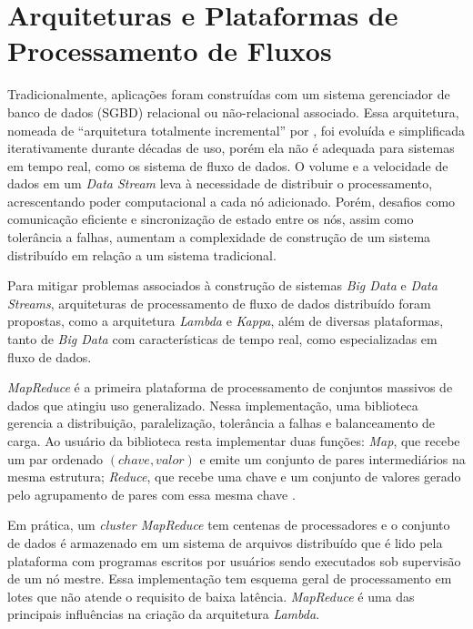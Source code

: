 \section{Arquiteturas e Plataformas de Processamento de Fluxos}
\label{sec:frameworks}

Tradicionalmente, aplicações
foram construídas com um sistema gerenciador de
banco de dados (SGBD) relacional ou não-relacional associado.
Essa arquitetura,
nomeada de ``arquitetura totalmente incremental'' por ,
foi evoluída e simplificada iterativamente durante décadas de uso, porém ela não
é adequada para sistemas em tempo real, como os sistema de fluxo de dados.
O volume e a velocidade de dados em um \emph{Data Stream} leva à necessidade de
distribuir o processamento, acrescentando poder computacional a cada nó
adicionado.
Porém, desafios como comunicação eficiente e sincronização de estado
entre os nós, assim como tolerância a falhas, aumentam a complexidade de
construção de um sistema distribuído em relação a um sistema tradicional.

\newcommand{\lambdaa}{\xspace\emph{Lambda}\xspace}
\newcommand{\kappaa}{\xspace\emph{Kappa}\xspace}

Para mitigar problemas associados à construção de sistemas \emph{Big Data}
e \emph{Data Streams},
arquiteturas de processamento de fluxo
de dados distribuído foram propostas, como a arquitetura \lambdaa
\cite{marz2015big} e \kappaa \cite{Kreps2014}, além
de
diversas plataformas, tanto de \emph{Big Data} com características de tempo real,
como especializadas em fluxo de dados.

\emph{MapReduce} é a primeira plataforma de processamento de conjuntos massivos
de dados que atingiu uso generalizado.
Nessa implementação, uma biblioteca gerencia a distribuição, paralelização,
tolerância a falhas e balanceamento de carga.
Ao usuário da biblioteca resta implementar duas funções:
\emph{Map}, que recebe um par ordenado
$(chave, valor)$ e emite um conjunto de pares intermediários na mesma estrutura;
\emph{Reduce}, que recebe uma chave e um conjunto de valores gerado pelo agrupamento
de pares com essa mesma chave \cite{Dean2004}.

Em prática, um \emph{cluster MapReduce} tem centenas de processadores e o
conjunto de dados é armazenado em um sistema de arquivos distribuído que é lido
pela plataforma com programas escritos por usuários sendo executados sob
supervisão de um nó mestre.
Essa implementação tem esquema geral de processamento em lotes que não atende o
requisito de baixa latência.
\nobreakdash \emph{MapReduce} é uma das principais influências na criação da arquitetura
\lambdaa \cite{marz2015big}.

